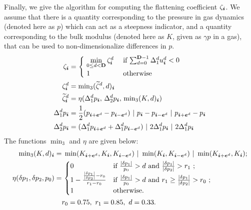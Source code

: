 Finally, we give the algorithm for computing the flattening coefficient 
$\zeta_{\boldsymbol{i}}$. We assume that there is a quantity corresponding to the
pressure in gas dynamics (denoted here as $p$) 
which can act as a steepness indicator, and a
quantity corresponding to the bulk modulus (denoted here as $K$, given
as $\gamma p$ in a gas), that can be used to non-dimensionalize
differences in $p$.
\begin{alignat}{1}
\label{eqn:flattening}
\zeta_{\boldsymbol{i}}
= & \,
  \begin{cases}
  ~ \underset{0 \le d < {\mathbf{D}}}{\min} \, \zeta^d_{\boldsymbol{i}} ~ &
    \text{if $\sum^{{\mathbf{D}} - 1}_{d=0} \Delta^d_1 u^d_{\boldsymbol{i}} < 0$}
  \\
  ~ 1 &
    \text{otherwise}
  \end{cases} \\
\zeta^d_{\boldsymbol{i}}
= & \; {\min}_3(\widetilde{\zeta}^d,d)_{\boldsymbol{i}} \notag \\
\widetilde{\zeta}^d_{\boldsymbol{i}}
= & \; \eta(\Delta^d_1 p_{\boldsymbol{i}}, \,
            \Delta^d_2 p_{\boldsymbol{i}}, \,
            {\min}_3(K,d)_{\boldsymbol{i}}) \notag \\
\Delta^d_1 p_{\boldsymbol{i}}
= & \; \frac{1}{2}(p_{{\boldsymbol{i}} + {\boldsymbol{e}}^d} - p_{{\boldsymbol{i}} - {\boldsymbol{e}}^d})
   ~ | ~     p_{\boldsymbol{i}}              - p_{{\boldsymbol{i}} - {\boldsymbol{e}}^d}
   ~ | ~     p_{{\boldsymbol{i}} + {\boldsymbol{e}}^d} - p_{\boldsymbol{i}} \notag \\
\Delta^d_2 p_{\boldsymbol{i}}
= & \; (\Delta^d_1 p_{{\boldsymbol{i}} + {\boldsymbol{e}}^d} + \Delta^d_1 p_{{\boldsymbol{i}} - {\boldsymbol{e}}^d})
 ~ | ~ 2 \Delta^d_1 p_{\boldsymbol{i}}
 ~ | ~ 2 \Delta^d_1 p_{\boldsymbol{i}} \notag
\end{alignat}
The functions ${\min}_3$ and $\eta$ are given below:
\begin{gather*}
\begin{split}
{\min}_3(K,d)_{\boldsymbol{i}}
= & \; \min(K_{{\boldsymbol{i}} + {\boldsymbol{e}}^d},K_{\boldsymbol{i}},K_{{\boldsymbol{i}} - {\boldsymbol{e}}^d})
~|~ \min(K_{\boldsymbol{i}},K_{{\boldsymbol{i}} - {\boldsymbol{e}}^d})
~|~ \min(K_{{\boldsymbol{i}} + {\boldsymbol{e}}^d},K_{\boldsymbol{i}}) ; \\
\eta(\delta p_1, \delta p_2, p_0)
= & \,
  \begin{cases}
  0 &
    \text{if $\frac{| \delta p_1 |}{p_0} > d$
         and $\frac{| \delta p_1 |}{| \delta p_2 |} > r_1$ ;} \\
  1 - \frac{\frac{| \delta p_1 |}{| \delta p_2 |} - r_0}{r_1 - r_0} &
    \text{if $\frac{| \delta p_1 |}{p_0} > d$
         and $r_1 \ge \frac{| \delta p_1 |}{| \delta p_2 |} > r_0$ ;} \\
  1 &
    \text{otherwise.}
  \end{cases}
\\
& r_0 = 0.75, ~ r_1 = 0.85, ~ d = 0.33 .
\end{split}
\end{gather*}

